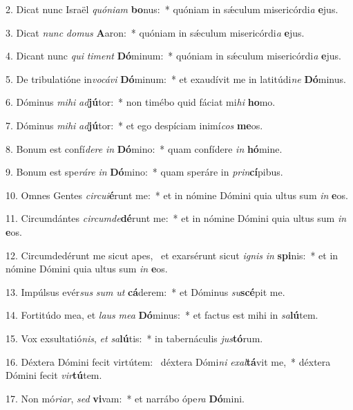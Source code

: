 2. Dicat nunc Israël \textit{quón}\textit{i}\textit{am} \textbf{bo}nus:~*  quóniam in sǽculum misericórdi\textit{a} \textbf{e}jus.\

3. Dicat \textit{nunc} \textit{do}\textit{mus} \textbf{A}aron:~*  quóniam in sǽculum misericórdi\textit{a} \textbf{e}jus.\

4. Dicant nunc \textit{qui} \textit{ti}\textit{ment} \textbf{Dó}minum:~*  quóniam in sǽculum misericórdi\textit{a} \textbf{e}jus.\

5. De tribulatióne in\textit{vo}\textit{cá}\textit{vi} \textbf{Dó}minum:~*  et exaudívit me in latitúdi\textit{ne} \textbf{Dó}minus.\

6. Dóminus \textit{mi}\textit{hi} \textit{ad}\textbf{jú}tor:~*  non timébo quid fáciat mi\textit{hi} \textbf{ho}mo.\

7. Dóminus \textit{mi}\textit{hi} \textit{ad}\textbf{jú}tor:~*  et ego despíciam inimí\textit{cos} \textbf{me}os.\

8. Bonum est confí\textit{de}\textit{re} \textit{in} \textbf{Dó}mino:~*  quam confídere \textit{in} \textbf{hó}mine.\

9. Bonum est spe\textit{rá}\textit{re} \textit{in} \textbf{Dó}mino:~*  quam speráre in \textit{prin}\textbf{cí}pibus.\

10. Omnes Gentes \textit{cir}\textit{cu}\textit{i}\textbf{é}runt me:~*  et in nómine Dómini quia ultus sum \textit{in} \textbf{e}os.\

11. Circumdántes \textit{cir}\textit{cum}\textit{de}\textbf{dé}runt me:~*  et in nómine Dómini quia ultus sum \textit{in} \textbf{e}os.\

12. Circumdedérunt me sicut apes, \dag\  et exarsérunt sicut \textit{i}\textit{gnis} \textit{in} \textbf{spi}nis:~*  et in nómine Dómini quia ultus sum \textit{in} \textbf{e}os.\

13. Impúlsus evér\textit{sus} \textit{sum} \textit{ut} \textbf{cá}derem:~*  et Dóminus \textit{su}\textbf{scé}pit me.\

14. Fortitúdo mea, et \textit{laus} \textit{me}\textit{a} \textbf{Dó}minus:~*  et factus est mihi in \textit{sa}\textbf{lú}tem.\

15. Vox exsultatió\textit{nis}, \textit{et} \textit{sa}\textbf{lú}tis:~*  in tabernáculis \textit{jus}\textbf{tó}rum.\

16. Déxtera Dómini fecit virtútem: \dag\  déxtera Dómi\textit{ni} \textit{ex}\textit{al}\textbf{tá}vit me,~*  déxtera Dómini fecit \textit{vir}\textbf{tú}tem.\

17. Non mó\textit{ri}\textit{ar}, \textit{sed} \textbf{vi}vam:~*  et narrábo ópe\textit{ra} \textbf{Dó}mini.\

